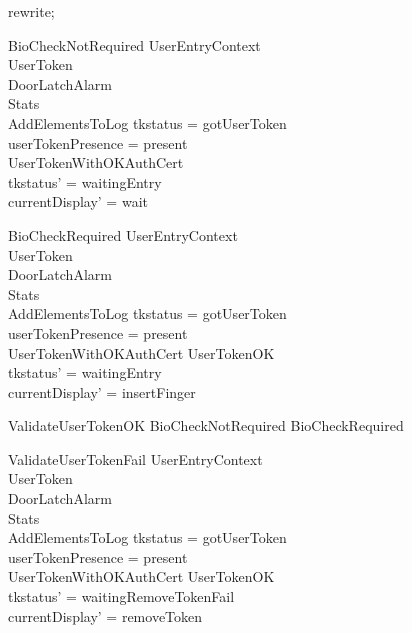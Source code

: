 \begin{zproof}
rewrite;
\end{zproof}

\begin{schema}{BioCheckNotRequired}
  UserEntryContext\\
  \Xi UserToken\\
  \Xi DoorLatchAlarm\\
  \Xi Stats\\
  AddElementsToLog
\where
  tkstatus = gotUserToken\\
  userTokenPresence = present\\
  UserTokenWithOKAuthCert\\
  tkstatus' = waitingEntry\\
  currentDisplay' = wait
\end{schema}

\begin{schema}{BioCheckRequired}
  UserEntryContext\\
  \Xi UserToken\\
  \Xi DoorLatchAlarm\\
  \Xi Stats\\
  AddElementsToLog
\where
  tkstatus = gotUserToken\\
  userTokenPresence = present\\
  \lnot  UserTokenWithOKAuthCert \land  UserTokenOK\\
  tkstatus' = waitingEntry\\
  currentDisplay' = insertFinger
\end{schema}

\begin{zed}
ValidateUserTokenOK  BioCheckNotRequired \lor  BioCheckRequired
\end{zed}

\begin{schema}{ValidateUserTokenFail}
  UserEntryContext\\
  \Xi UserToken\\
  \Xi DoorLatchAlarm\\
  \Xi Stats\\
  AddElementsToLog
\where
  tkstatus = gotUserToken\\
  userTokenPresence = present\\
  \lnot  UserTokenWithOKAuthCert \land  \lnot  UserTokenOK\\
  tkstatus' = waitingRemoveTokenFail\\
  currentDisplay' = removeToken
\end{schema}

